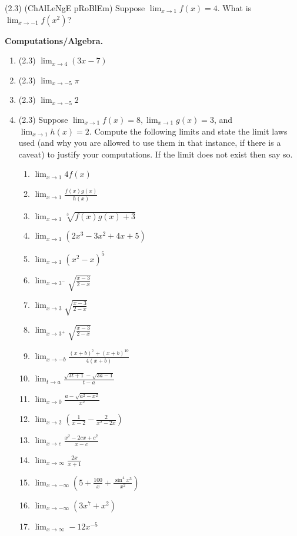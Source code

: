 \documentclass[11pt,letterpaper]{article}
\begin{document}
\item (2.3) (ChAlLeNgE pRoBlEm) Suppose $\lim_{x\to 1}f(x)=4$.  What is $\lim_{x\to -1}f(x^2)$? 

\vspace{1pc}
\item \textbf{Computations/Algebra.} 

\begin{enumerate}
\item (2.3) $\lim_{x\to 4}(3x-7)$
\item (2.3) $\lim_{x\to -5}\pi$
\item (2.3) $\lim_{x\to -5}2$
\item (2.3) Suppose $\lim_{x\to 1}f(x)=8,\lim_{x\to 1}g(x)=3$, and $\lim_{x\to 1}h(x)=2$.  Compute the following limits and state the limit laws used (and why you are allowed to use them in that instance, if there is a caveat) to justify your computations.  If the limit does not exist then say so.
\begin{enumerate}
\item $\lim_{x\to 1}4f(x)$
\item $\lim_{x\to 1}\frac{f(x)g(x)}{h(x)}$
\item $\lim_{x\to 1}\sqrt[3]{f(x)g(x)+3}$
\item $\lim_{x\to 1}(2x^3-3x^2+4x+5)$
\item $\lim_{x\to 1}\left(x^2-x\right)^5$
\item $\lim_{x\to 3^-}\sqrt{\frac{x-3}{2-x}}$
\item $\lim_{x\to 3}\sqrt{\frac{x-3}{2-x}}$
\item $\lim_{x\to 3^+}\sqrt{\frac{x-3}{2-x}}$
\item $\lim_{x\to -b}\frac{(x+b)^7+(x+b)^{10}}{4(x+b)}$
\item $\lim_{t\to a}\frac{\sqrt{3t+1}-\sqrt{3a-1}}{t-a}$
\item $\lim_{x\to 0}\frac{a-\sqrt{a^2-x^2}}{x^2}$
\item $\lim_{x\to 2}\left(\frac{1}{x-2}-\frac{2}{x^2-2x}\right)$
\item $\lim_{x\to c}\frac{x^2-2cx+c^2}{x-c}$
\item $\lim_{x\to\infty}\frac{2x}{x+1}$
\item $\lim_{x\to -\infty}\left(5+\frac{100}{x}+\frac{\sin^4x^3}{x^2}\right)$
\item $\lim_{x\to -\infty}\left(3x^7+x^2\right)$
\item $\lim_{x\to\infty}-12x^{-5}$
\end{enumerate}


\end{enumerate}
\end{document}
